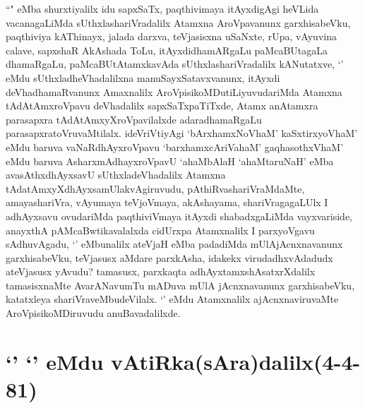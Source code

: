 \begin{artha}
``\stext" eMba shurxtiyalilx idu sapxSaTx, paqthivimaya itAyxdigAgi heVLida vacanagaLiMda sUthxlashariVradalilx Atamxna AroVpavanunx garxhisabeVku, paqthiviya kAThinayx, jalada darxva, teVjasisxna uSaNxte, rUpa, vAyuvina calave, sapxshaR AkAshada ToLu, itAyxdidhamARgaLu paMcaBUtagaLa dhamaRgaLu, paMcaBUtAtamxkavAda sUthxlashariVradalilx kANutatxve, `\stext' eMdu sUthxladheVhadalilxna manuSayxSatavxvanunx, \stext itAyxdi deVhadhamaRvanunx Amaxnalilx AroVpisikoMDutiLiyuvudariMda Atamxna tAdAtAmxroVpavu deVhadalilx sapxSaTxpaTiTxde, Atamx anAtamxra parasapxra tAdAtAmxyXroVpavilalxde adaradhamaRgaLu parasapxratoVruvaMtilalx. ideVriVtiyAgi `bArxhamxNoVhaM' kaSxtirxyoVhaM' eMdu baruva vaNaRdhAyxroVpavu `barxhamxcAriVahaM' gaqhasothxV\s haM' eMdu baruva AsharxmAdhayxroVpavU `ahaMbAlaH `ahaMtaruNaH' eMba avasAthxdhAyxsavU sUthxladeVhadalilx Atamxna tAdatAmxyXdhAyxsamUlakvAgiruvudu, pAthiRvashariVraMdaMte, amayashariVra, vAyumaya  teVjoVmaya, akAshayama, shariVragagaLUlx I adhAyxsavu ovudariMda paqthiviVmaya itAyxdi shabadxgaLiMda vayxvariside, anayxthA pAMcaBwtikavalalxda cidUrxpa Atamxnalilx I parxyoVgavu sAdhuvAgadu, `\stext' eMbunalilx ateVjaH eMba padadiMda mUlAjAcnxnavanunx garxhisabeVku, teVjasusx aMdare parxkAsha, idakekx virudadhxvAdadudx ateVjasusx yAvudu? tamasusx, parxkaqta adhAyxtamxshAsatxrXdalilx tamasisxnaMte AvarANavumTu mADuva mUlA jAcnxnavanunx garxhisabeVku, katatxleya shariVraveMbudeVilalx. `\stext' eMdu Atamxnalilx ajAcnxnaviruvaMte AroVpisikoMDiruvudu anuBavadalilxde.
\end{artha}

\section*{`\stext' `\stext' eMdu vAtiRka(sAra)dalilx(4-4-81)}


